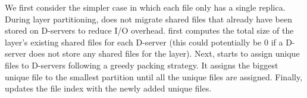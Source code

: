 We first consider the simpler case in which each file only has
a single replica. During layer partitioning, \sysname does not migrate shared files that already
have been stored on D-servers to reduce I/O overhead.
%
%
\sysname first computes the total size of the layer's existing shared files for each D-server (this could
potentially be 0 if a D-server does not store any shared files for the layer).
Next, \sysname starts to assign unique files to D-servers following a greedy packing strategy.
It assigns the biggest unique file to the smallest partition until all the unique files are assigned.
Finally, \sysname updates the file index with the newly added unique files.

